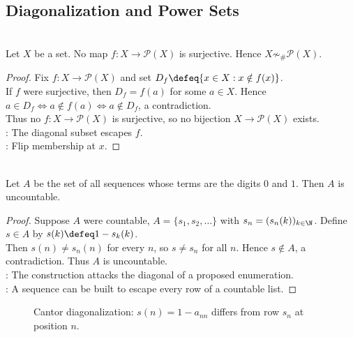 \subsection{Diagonalization and Power Sets}

\begin{theorem} \label{thm:cantor-power-set-theorem} \\
Let $X$ be a set. No map $f:X\to\mathcal{P}(X)$ is surjective. Hence $X\not\sim_{\#}\mathcal{P}(X)$.
\begin{proof} Fix $f:X\to\mathcal{P}(X)$ and set $D_f\defeq\{x\in X:x\notin f(x)\}$.\\
If $f$ were surjective, then $D_f=f(a)$ for some $a\in X$. Hence $a\in D_f\Longleftrightarrow a\notin f(a)\Longleftrightarrow a\notin D_f$, a contradiction.\\
Thus no $f:X\to\mathcal{P}(X)$ is surjective, so no bijection $X\to\mathcal{P}(X)$ exists.\\
: The diagonal subset escapes $f$.\\
: Flip membership at $x$.
\end{proof}
\end{theorem}

\begin{theorem} \label{thm:binary-sequences-uncountable} \\
Let $A$ be the set of all sequences whose terms are the digits $0$ and $1$. Then $A$ is uncountable.
\begin{proof}
Suppose $A$ were countable, $A=\{s_1,s_2,\ldots\}$ with $s_n=(s_n(k))_{k\in\N}$. Define $s\in A$ by $s(k)\defeq 1-s_k(k)$.\\
Then $s(n)\neq s_n(n)$ for every $n$, so $s\neq s_n$ for all $n$. Hence $s\notin A$, a contradiction. Thus $A$ is uncountable.\\
: The construction attacks the diagonal of a proposed enumeration.\\
: A sequence can be built to escape every row of a countable list.
\end{proof}
\end{theorem}

\begin{figure}[H]
  \centering
  
  \caption{Cantor diagonalization: $s(n)=1-a_{nn}$ differs from row $s_n$ at position $n$.}
  \label{fig:cantor-diagonal-binary-sequences}
\end{figure}

